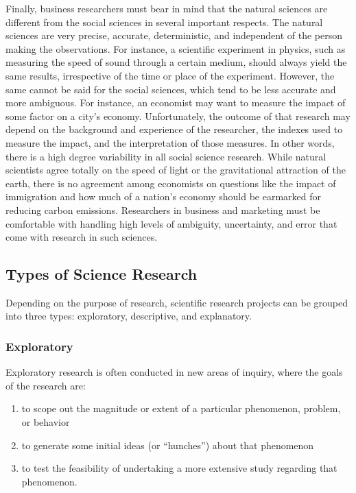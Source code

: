 \documentclass[]{book}
\providecommand{\tightlist}{%
  \setlength{\itemsep}{0pt}\setlength{\parskip}{0pt}}
\theoremstyle{definition}
\theoremstyle{definition}
\theoremstyle{definition}
\theoremstyle{remark}
\begin{document}
Finally, business researchers must bear in mind that the natural
sciences are different from the social sciences in several important
respects. The natural sciences are very precise, accurate,
deterministic, and independent of the person making the observations.
For instance, a scientific experiment in physics, such as measuring the
speed of sound through a certain medium, should always yield the same
results, irrespective of the time or place of the experiment. However,
the same cannot be said for the social sciences, which tend to be less
accurate and more ambiguous. For instance, an economist may want to
measure the impact of some factor on a city's economy. Unfortunately,
the outcome of that research may depend on the background and experience
of the researcher, the indexes used to measure the impact, and the
interpretation of those measures. In other words, there is a high degree
variability in all social science research. While natural scientists
agree totally on the speed of light or the gravitational attraction of
the earth, there is no agreement among economists on questions like the
impact of immigration and how much of a nation's economy should be
earmarked for reducing carbon emissions. Researchers in business and
marketing must be comfortable with handling high levels of ambiguity,
uncertainty, and error that come with research in such sciences.

\hypertarget{types-of-science-research}{%
\subsection{Types of Science Research}\label{types-of-science-research}}

Depending on the purpose of research, scientific research projects can
be grouped into three types: exploratory, descriptive, and explanatory.

\hypertarget{exploratory}{%
\subsubsection{Exploratory}\label{exploratory}}

Exploratory research is often conducted in new areas of inquiry, where
the goals of the research are:

\begin{enumerate}
\def\labelenumi{\arabic{enumi}.}
\tightlist
\item
  to scope out the magnitude or extent of a particular phenomenon,
  problem, or behavior
\item
  to generate some initial ideas (or ``hunches'') about that phenomenon
\item
  to test the feasibility of undertaking a more extensive study
  regarding that phenomenon.
\end{enumerate}
\end{document}
